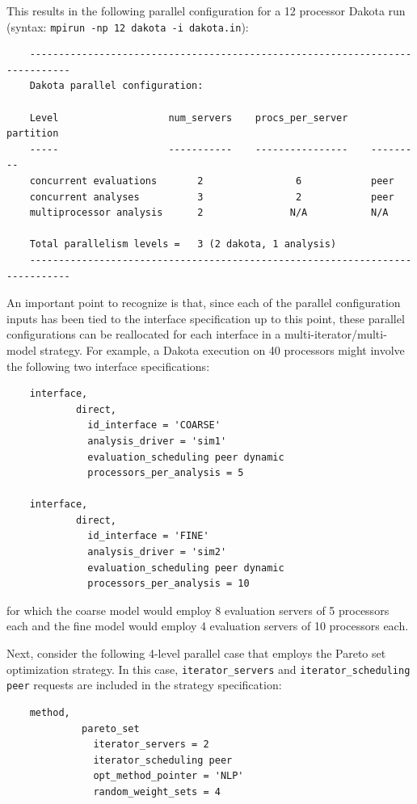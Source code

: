 This results in the following parallel configuration for a 12
processor Dakota run \\
(syntax: \texttt{mpirun -np 12 dakota -i dakota.in}):
\begin{small}
\begin{verbatim}
    -----------------------------------------------------------------------------
    Dakota parallel configuration:

    Level                   num_servers    procs_per_server    partition
    -----                   -----------    ----------------    ---------
    concurrent evaluations       2                6            peer
    concurrent analyses          3                2            peer
    multiprocessor analysis      2               N/A           N/A

    Total parallelism levels =   3 (2 dakota, 1 analysis)
    -----------------------------------------------------------------------------
\end{verbatim}
\end{small}

An important point to recognize is that, since each of the parallel
configuration inputs has been tied to the interface specification up
to this point, these parallel configurations can be reallocated for
each interface in a multi-iterator/multi-model strategy. For example,
a Dakota execution on 40 processors might involve the following two
interface specifications:
\begin{small}
\begin{verbatim}
    interface,
            direct,
              id_interface = 'COARSE'
              analysis_driver = 'sim1'
              evaluation_scheduling peer dynamic
              processors_per_analysis = 5

    interface,
            direct,
              id_interface = 'FINE'
              analysis_driver = 'sim2'
              evaluation_scheduling peer dynamic
              processors_per_analysis = 10
\end{verbatim}
\end{small}

for which the coarse model would employ 8 evaluation servers of 5 
processors each and the fine model would employ 4 evaluation servers 
of 10 processors each.

Next, consider the following 4-level parallel case that employs the
Pareto set optimization strategy. In this case,
\texttt{iterator\_servers} and \texttt{iterator\_scheduling peer}
requests are included in the strategy specification:
\begin{small}
\begin{verbatim}
    method,
             pareto_set
               iterator_servers = 2
               iterator_scheduling peer
               opt_method_pointer = 'NLP'
               random_weight_sets = 4
\end{verbatim}
\end{small}

